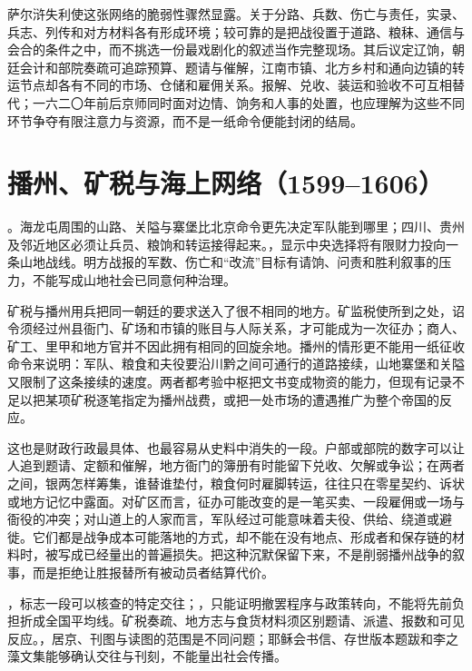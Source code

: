 萨尔浒失利使这张网络的脆弱性骤然显露。关于分路、兵数、伤亡与责任，实录、兵志、列传和对方材料各有形成环境；较可靠的是把战役置于道路、粮秣、通信与会合的条件之中，而不挑选一份最戏剧化的叙述当作完整现场。其后议定辽饷，朝廷会计和部院奏疏可追踪预算、题请与催解，江南市镇、北方乡村和通向边镇的转运节点却各有不同的市场、仓储和雇佣关系。报解、兑收、装运和验收不可互相替代；一六二〇年前后京师同时面对边情、饷务和人事的处置，也应理解为这些不同环节争夺有限注意力与资源，而不是一纸命令便能封闭的结局。

\section{播州、矿税与海上网络（1599--1606）}

。海龙屯周围的山路、关隘与寨堡比北京命令更先决定军队能到哪里；四川、贵州及邻近地区必须让兵员、粮饷和转运接得起来。，显示中央选择将有限财力投向一条山地战线。明方战报的军数、伤亡和“改流”目标有请饷、问责和胜利叙事的压力，不能写成山地社会已同意何种治理。

\noindent 矿税与播州用兵把同一朝廷的要求送入了很不相同的地方。矿监税使所到之处，诏令须经过州县衙门、矿场和市镇的账目与人际关系，才可能成为一次征办；商人、矿工、里甲和地方官并不因此拥有相同的回旋余地。播州的情形更不能用一纸征收命令来说明：军队、粮食和夫役要沿川黔之间可通行的道路接续，山地寨堡和关隘又限制了这条接续的速度。两者都考验中枢把文书变成物资的能力，但现有记录不足以把某项矿税逐笔指定为播州战费，或把一处市场的遭遇推广为整个帝国的反应。

这也是财政行政最具体、也最容易从史料中消失的一段。户部或部院的数字可以让人追到题请、定额和催解，地方衙门的簿册有时能留下兑收、欠解或争讼；在两者之间，银两怎样筹集，谁替谁垫付，粮食何时雇脚转运，往往只在零星契约、诉状或地方记忆中露面。对矿区而言，征办可能改变的是一笔买卖、一段雇佣或一场与衙役的冲突；对山道上的人家而言，军队经过可能意味着夫役、供给、绕道或避徙。它们都是战争成本可能落地的方式，却不能在没有地点、形成者和保存链的材料时，被写成已经量出的普遍损失。把这种沉默保留下来，不是削弱播州战争的叙事，而是拒绝让胜报替所有被动员者结算代价。

，标志一段可以核查的特定交往；，只能证明撤罢程序与政策转向，不能将先前负担折成全国平均线。矿税奏疏、地方志与食货材料须区别题请、派遣、报数和可见反应。，居京、刊图与读图的范围是不同问题；耶稣会书信、存世版本题跋和李之藻文集能够确认交往与刊刻，不能量出社会传播。

